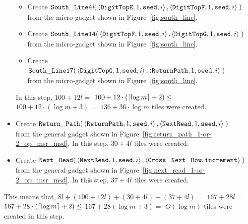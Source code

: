 \begin{itemize}
\begin{itemize}
        \item Create
        $\begin{aligned}[t]
            {\tt South\_Line4\textit{l}}(& \left\langle {\tt DigitTopE}, 1, {\tt seed}, i \right\rangle,
                                           \left\langle {\tt DigitTopF}, 1, {\tt seed}, i \right\rangle \;)
        \end{aligned}$\\ from the micro-gadget shown in Figure~\ref{fig:south_line}.

        \item Create
        $\begin{aligned}[t]
            {\tt South\_Line14}(& \left\langle {\tt DigitTopF}, 1, {\tt seed}, i\right\rangle,
                                  \left\langle {\tt DigitTopG}, 1, {\tt seed}, i\right\rangle \;)
        \end{aligned}$\\ from the micro-gadget shown in Figure~\ref{fig:south_line}.

        \item Create
        $\begin{aligned}[t]
            {\tt South\_Line17}(& \left\langle {\tt DigitTopG},  1, {\tt seed}, i \right\rangle,
                                  \left\langle {\tt ReturnPath}, 1, {\tt seed}, i  \right\rangle \;)
        \end{aligned}$\\from the micro-gadget shown in Figure~\ref{fig:south_line}.
    \end{itemize}
    In this step, $100 + 12l=$
    $100 + 12 \cdot \left( \ceil*{\log m} + 2 \right) \leq$
    $100 + 12 \cdot \left( {\log m} + 3 \right) =$
    $136 + 36 \cdot {\log m}$ tiles were created.

    \item Create
    $\begin{aligned}[t]
            \returnpath(&\left\langle {\tt ReturnPath}, 1, {\tt seed}, i \right\rangle,
                         \left\langle {\tt NextRead},   1, {\tt seed}, i \right\rangle \;)
    \end{aligned}$\\from the general gadget shown in Figure~\ref{fig:return_path_1-or-2_op_msr_msd}.
    In this step, $30 + 4l$ tiles were created.

    \item Create
    $\begin{aligned}[t]
        \nextread(& \left\langle {\tt NextRead}, 1,      {\tt seed}, i  \right\rangle,
                    \left\langle {\tt Cross\_Next\_Row}, {\tt increment}\right\rangle \;)
    \end{aligned}$\\from the general gadget shown in Figure~\ref{fig:next_read_1-or-2_op_msr_msd}.
    In this step, $37 + 4l$ tiles were created.
\end{itemize}
This means that, $8l + (100 + 12l) + (30 + 4l)  + (37 + 4l) =$
$167 + 28l =$
$167 + 28 \cdot \left( \ceil*{\log m} + 2 \right) \leq $
$167 + 28 \left( {\log m} + 3 \right) =$
$O \left( {\log m} \right) $ tiles were created in this step.
%

